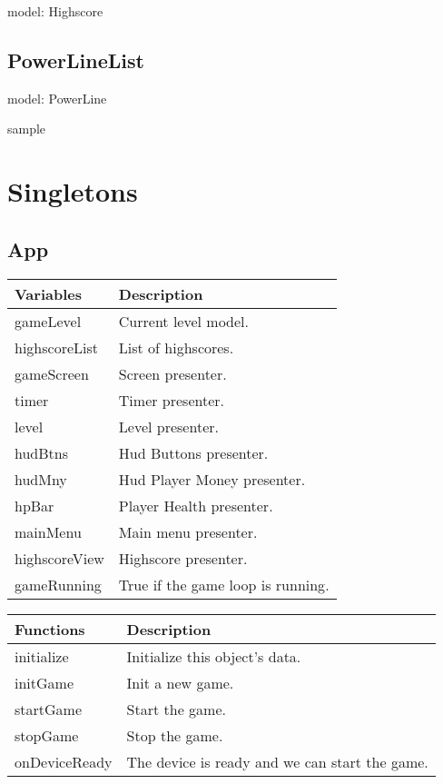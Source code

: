 	
	model: Highscore

	

\subsection*{PowerLineList}

	model: PowerLine

	sample

\clearpage

\section{Singletons}

\subsection*{App}

	\begin{table}[H]
	\begin{tabular}{p{4cm} | p{8cm} }
	\hline
	\rowcolor{gray}
	Variables & Description \\ \hline
	gameLevel & Current level model. \\ \hline
  	highscoreList & List of highscores. \\ \hline
  	gameScreen & Screen presenter. \\ \hline
  	timer & Timer presenter. \\ \hline
  	level & Level presenter. \\ \hline
  	hudBtns & Hud Buttons presenter. \\ \hline
  	hudMny & Hud Player Money presenter. \\ \hline
  	hpBar & Player Health presenter. \\ \hline
  	mainMenu & Main menu presenter. \\ \hline
  	highscoreView & Highscore presenter. \\ \hline
  	gameRunning & True if the game loop is running. \\ \hline
	
	\end{tabular}
	\end{table}

	\begin{table}[H]
	\begin{tabular}{p{4cm} | p{8cm} }
	\hline
	\rowcolor{gray}
	Functions & Description \\ \hline
	initialize & Initialize this object's data. \\ \hline
  	initGame & Init a new game. \\ \hline
  	startGame & Start the game. \\ \hline
  	stopGame & Stop the game. \\ \hline
  	onDeviceReady & The device is ready and we can start the game. \\ \hline

	\end{tabular}
	\end{table}

